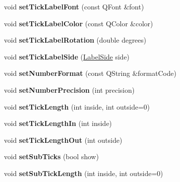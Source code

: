 \begin{DoxyCompactItemize}
void {\bfseries set\+Tick\+Label\+Font} (const Q\+Font \&font)
\item 
\mbox{\label{class_q_c_p_axis_a395e445c3fe496b935bee7b911ecfd1c}} 
void {\bfseries set\+Tick\+Label\+Color} (const Q\+Color \&color)
\item 
\mbox{\label{class_q_c_p_axis_a1bddd4413df8a576b7ad4b067fb33375}} 
void {\bfseries set\+Tick\+Label\+Rotation} (double degrees)
\item 
\mbox{\label{class_q_c_p_axis_a13ec644fc6e22715744c92c6dfa4f0fa}} 
void {\bfseries set\+Tick\+Label\+Side} (\hyperlink{class_q_c_p_axis_a24b13374b9b8f75f47eed2ea78c37db9}{Label\+Side} side)
\item 
\mbox{\label{class_q_c_p_axis_ae585a54dc2aac662e90a2ca82f002590}} 
void {\bfseries set\+Number\+Format} (const Q\+String \&format\+Code)
\item 
\mbox{\label{class_q_c_p_axis_a21dc8023ad7500382ad9574b48137e63}} 
void {\bfseries set\+Number\+Precision} (int precision)
\item 
\mbox{\label{class_q_c_p_axis_a62ec40bebe3540e9c1479a8fd2be3b0d}} 
void {\bfseries set\+Tick\+Length} (int inside, int outside=0)
\item 
\mbox{\label{class_q_c_p_axis_afae1a37a99611366275a51204d991739}} 
void {\bfseries set\+Tick\+Length\+In} (int inside)
\item 
\mbox{\label{class_q_c_p_axis_a3b8a0debd1ffedd2c22d0592dfbb4e62}} 
void {\bfseries set\+Tick\+Length\+Out} (int outside)
\item 
\mbox{\label{class_q_c_p_axis_afa0ce8d4d0015ed23dcde01f8bc30106}} 
void {\bfseries set\+Sub\+Ticks} (bool show)
\item 
\mbox{\label{class_q_c_p_axis_ab702d6fd42fc620607435339a1c2a2e1}} 
void {\bfseries set\+Sub\+Tick\+Length} (int inside, int outside=0)
\item 
\mbox{\label{class_q_c_p_axis_ac46fa2a993a9f5789540977610acf1de}} 

\end{DoxyCompactItemize}
